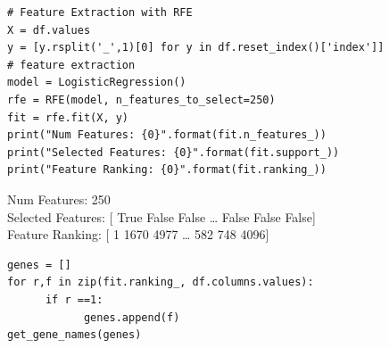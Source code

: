 \documentclass[11pt]{article}
\begin{document}
\begin{verbatim}
# Feature Extraction with RFE
X = df.values
y = [y.rsplit('_',1)[0] for y in df.reset_index()['index']]
# feature extraction
model = LogisticRegression()
rfe = RFE(model, n_features_to_select=250)
fit = rfe.fit(X, y)
print("Num Features: {0}".format(fit.n_features_))
print("Selected Features: {0}".format(fit.support_))
print("Feature Ranking: {0}".format(fit.ranking_))
\end{verbatim}

Num Features: 250\\
Selected Features: [ True False False \ldots{} False False False]\\
Feature Ranking: [   1 1670 4977 \ldots{}  582  748 4096]\\


\begin{verbatim}
genes = []
for r,f in zip(fit.ranking_, df.columns.values):
      if r ==1:
            genes.append(f)
get_gene_names(genes)
\end{verbatim}
\end{document}
